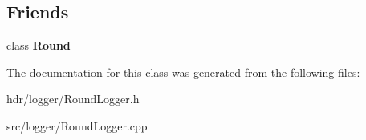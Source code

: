 \subsection*{Friends}
\begin{DoxyCompactItemize}
\item 
class {\bfseries Round}\label{class_round_logger_aae72f8e1249fbf187032c257b544873d}

\end{DoxyCompactItemize}


The documentation for this class was generated from the following files\-:\begin{DoxyCompactItemize}
\item 
hdr/logger/Round\-Logger.\-h\item 
src/logger/Round\-Logger.\-cpp\end{DoxyCompactItemize}
